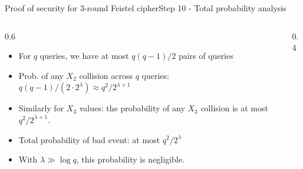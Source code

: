 \ifdefined\PRESENTATION\else\PassOptionsToClass{handout}{beamer}\fi\documentclass[aspectratio=169, lualatex]{beamer}
\begin{document}
	\begin{frame}{Proof of security for 3-round Feistel cipher}{Step 10 - Total probability analysis}
		\begin{columns}[c]
			\begin{column}{0.6\textwidth}
				\begin{itemize}
					\item For $q$ queries, we have at most $q(q-1)/2$ pairs of queries
					\item Prob. of any $X_2$ collision across $q$ queries:
					      $q(q-1)/(2 \cdot 2^{\lambda}) \approx q^2/2^{\lambda+1}$
					\item Similarly for $X_3$ values: the probability of any $X_3$ collision is at most $q^2/2^{\lambda+1}$.
					\item Total probability of bad event: at most $q^2/2^{\lambda}$
					\item With $\lambda \gg \log q$, this probability is negligible.
				\end{itemize}
			\end{column}
			\begin{column}{0.4\textwidth}
				\vspace{-1.5cm}
				\begin{center}
				\end{center}
			\end{column}
		\end{columns}
	\end{frame}
\end{document}
